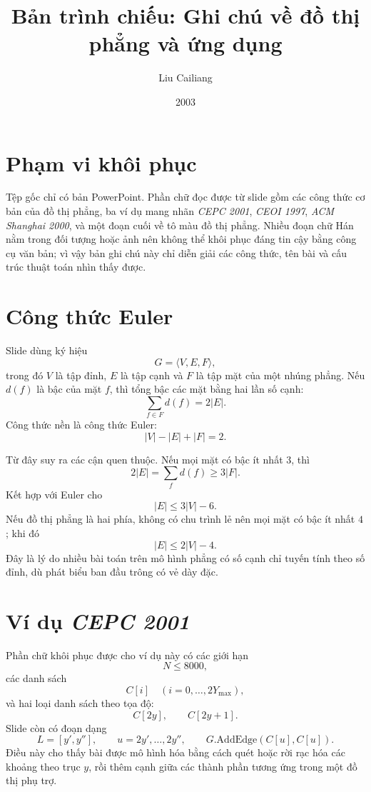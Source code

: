 \documentclass[11pt]{article}
\title{Bản trình chiếu: Ghi chú về đồ thị phẳng và ứng dụng}
\author{Liu Cailiang}
\date{2003}
\begin{document}
\maketitle


\section{Phạm vi khôi phục}

Tệp gốc chỉ có bản PowerPoint. Phần chữ đọc được từ slide gồm các công thức
cơ bản của đồ thị phẳng, ba ví dụ mang nhãn \textit{CEPC 2001},
\textit{CEOI 1997}, \textit{ACM Shanghai 2000}, và một đoạn cuối về tô màu
đồ thị phẳng. Nhiều đoạn chữ Hán nằm trong đối tượng hoặc ảnh nên không thể
khôi phục đáng tin cậy bằng công cụ văn bản; vì vậy bản ghi chú này chỉ diễn
giải các công thức, tên bài và cấu trúc thuật toán nhìn thấy được.

\section{Công thức Euler}

Slide dùng ký hiệu
\[
  G=\langle V,E,F\rangle,
\]
trong đó \(V\) là tập đỉnh, \(E\) là tập cạnh và \(F\) là tập mặt của một
nhúng phẳng. Nếu \(d(f)\) là bậc của mặt \(f\), thì tổng bậc các mặt bằng
hai lần số cạnh:
\[
  \sum_{f\in F}d(f)=2|E|.
\]
Công thức nền là công thức Euler:
\[
  |V|-|E|+|F|=2.
\]

Từ đây suy ra các cận quen thuộc. Nếu mọi mặt có bậc ít nhất \(3\), thì
\[
  2|E|=\sum_f d(f)\ge 3|F|.
\]
Kết hợp với Euler cho
\[
  |E|\le 3|V|-6.
\]
Nếu đồ thị phẳng là hai phía, không có chu trình lẻ nên mọi mặt có bậc ít
nhất \(4\); khi đó
\[
  |E|\le 2|V|-4.
\]
Đây là lý do nhiều bài toán trên mô hình phẳng có số cạnh chỉ tuyến tính theo
số đỉnh, dù phát biểu ban đầu trông có vẻ dày đặc.

\section{Ví dụ \textit{CEPC 2001}}

Phần chữ khôi phục được cho ví dụ này có các giới hạn
\[
  N\le 8000,
\]
các danh sách
\[
  C[i]\quad (i=0,\ldots,2Y_{\max}),
\]
và hai loại danh sách theo tọa độ:
\[
  C[2y],\qquad C[2y+1].
\]
Slide còn có đoạn dạng
\[
  L=[y',y''],\qquad u=2y',\ldots,2y'',\qquad
  G.\mathrm{AddEdge}(C[u],C[u]).
\]
Điều này cho thấy bài được mô hình hóa bằng cách quét hoặc rời rạc hóa các
khoảng theo trục \(y\), rồi thêm cạnh giữa các thành phần tương ứng trong một
đồ thị phụ trợ.
\end{document}
